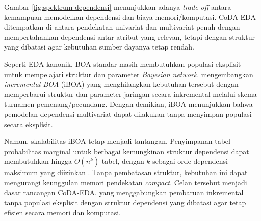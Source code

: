 Gambar \ref{fig:spektrum-dependensi} menunjukkan adanya \textit{trade-off} antara kemampuan memodelkan dependensi dan biaya memori/komputasi.
CoDA-EDA ditempatkan di antara pendekatan univariat dan multivariat penuh dengan mempertahankan dependensi antar-atribut yang relevan, tetapi dengan struktur yang dibatasi agar kebutuhan sumber dayanya tetap rendah.

Seperti EDA kanonik, BOA standar masih membutuhkan populasi eksplisit untuk mempelajari struktur dan parameter \textit{Bayesian network}.
\textcite{pelikan_iboa_2008} mengembangkan \textit{incremental BOA} (iBOA) yang menghilangkan kebutuhan tersebut dengan memperbarui struktur dan parameter jaringan secara inkremental melalui skema turnamen pemenang/pecundang.
Dengan demikian, iBOA menunjukkan bahwa pemodelan dependensi multivariat dapat dilakukan tanpa menyimpan populasi secara eksplisit.

Namun, skalabilitas iBOA tetap menjadi tantangan.
Penyimpanan tabel probabilitas marginal untuk berbagai kemungkinan struktur dependensi dapat membutuhkan hingga $O(n^k)$\label{first:symbol-onk} tabel, dengan $k$\label{first:symbol-k} sebagai orde dependensi maksimum yang diizinkan \parencite{pelikan_iboa_2008}.
Tanpa pembatasan struktur, kebutuhan ini dapat mengurangi keunggulan memori pendekatan \textit{compact}.
Celan tersebut menjadi dasar rancangan CoDA-EDA, yang menggabungkan pembaruan inkremental tanpa populasi eksplisit dengan struktur dependensi yang dibatasi agar tetap efisien secara memori dan komputasi.